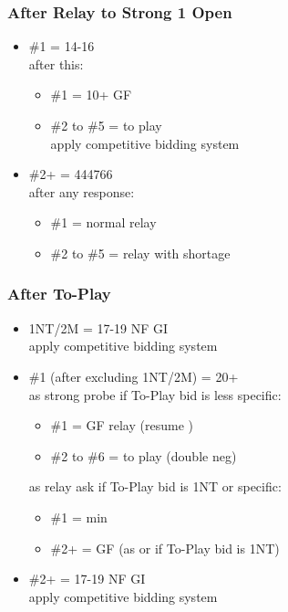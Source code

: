\documentclass{article}
\begin{document}
\begin{multicols}{2}
\subsubsection{After Relay to Strong 1 Open}
\begin{itemize}
    \item \#1 = 14-16 \\
        after this:
        \begin{itemize}
            \item \#1 = 10+ GF
            \item \#2 to \#5 = to play \\
                apply competitive bidding system
        \end{itemize}
    \item \#2+ = 444766 \\
        after any response:
        \begin{itemize}
            \item \#1 = normal relay
            \item \#2 to \#5 = relay with shortage
        \end{itemize}
\end{itemize}

\subsubsection{After To-Play}
\begin{itemize}
    \item 1NT/2M = 17-19 NF GI \\
        apply competitive bidding system
    \item \#1 (after excluding 1NT/2M) = 20+ \\
        as strong probe if To-Play bid is less specific:
        \begin{itemize}
            \item \#1 = GF relay (resume )
            \item \#2 to \#6 = to play (double neg)
        \end{itemize}
        as relay ask if To-Play bid is 1NT or specific:
        \begin{itemize}
            \item \#1 = min
            \item \#2+ = GF (as  or
                 if To-Play bid is 1NT)
        \end{itemize}
    \item \#2+ = 17-19 NF GI \\
        apply competitive bidding system
\end{itemize}


\end{multicols}
\end{document}
